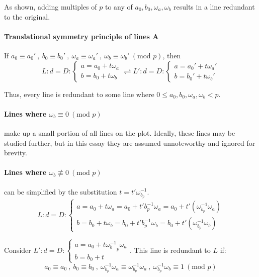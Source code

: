 \documentclass{article}
\begin{document}
As shown, adding multiples of \(p\) to any of \(a_0,b_0,\omega_a,\omega_b\) results in a line redundant to the original.

\paragraph{Translational symmetry principle of lines A} If
\(a_0 \equiv a_0'\ ,\ b_0 \equiv b_0'\ ,\ \omega_a \equiv \omega_a'\ ,\ \omega_b \equiv \omega_b'\ (\text{mod }p)\), then
	\[L:d=D:\begin{cases}a=a_0+t\omega_a \\b=b_0+t\omega_b\end{cases} \rightleftharpoons L':d=D:\begin{cases}a=a_0'+t\omega_a' \\b=b_0'+t\omega_b'\end{cases}\] 

Thus, every line is redundant to some line where \(0 \leq a_0,b_0,\omega_a,\omega_b < p\). 

\paragraph{Lines where \(\omega_b \equiv 0\ (\text{mod }p)\)} make up a small portion of all lines on the plot. Ideally, these lines may be studied further, but in this essay they are assumed unnoteworthy and ignored for brevity.

\paragraph{Lines where \(\omega_b \not\equiv 0\ (\text{mod }p)\)} can be simplified by the substitution \(t = t' \omega_{b_p}^{-1}\).
	\[L:d=D:\begin{cases}
			a=a_0+t\omega_a=a_0+t' b^{-1}_p\omega_a=a_0+t'(\omega_{b_p}^{-1}\omega_a)\\
			b=b_0+t\omega_b=b_0+t' b^{-1}_p\omega_b=b_0+t'(\omega_{b_p}^{-1}\omega_b)
			\end{cases}\]

Consider \(L':d=D:\begin{cases}a=a_0+t{\omega_b^{-1}}_p\omega_a \\ b=b_0+t \end{cases}\). This line is redundant to \(L\) if:
	\[a_0 \equiv a_0\ ,\ b_0 \equiv b_0\ ,\ \omega_{b_p}^{-1}\omega_a \equiv \omega_{b_p}^{-1}\omega_a\ ,\ \omega_{b_p}^{-1}\omega_b \equiv 1\ (\text{mod }p)\]
\end{document}
